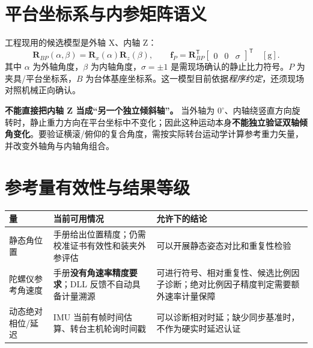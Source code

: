 \section{平台坐标系与内参矩阵语义}
工程现用的候选模型是外轴 X、内轴 Z：
\begin{equation}
\mathbf R_{BP}(\alpha,\beta)=\mathbf R_x(\alpha)\mathbf R_z(\beta),\qquad
\mathbf f_P=\mathbf R_{BP}^{\mathsf T}\begin{bmatrix}0&0&\sigma\end{bmatrix}^{\mathsf T}\quad[\mathrm g].
\label{eq:refacc}
\end{equation}
其中 $\alpha$ 为外轴角度，$\beta$ 为内轴角度，$\sigma=\pm1$ 是需现场确认的静止比力符号。$P$ 为夹具/平台坐标系，$B$ 为台体基座坐标系。这一模型目前依据\emph{程序约定}，还须现场对照机械正向确认。

\begin{keynote}
\textbf{不能直接把内轴 Z 当成“另一个独立倾斜轴”。} 当外轴为 $0^\circ$、内轴绕竖直方向旋转时，静止重力方向在平台坐标中不变化；因此这种运动本身\textbf{不能独立验证双轴倾角变化}。要验证横滚/俯仰的复合角度，需按实际转台运动学计算参考重力矢量，并改变外轴角与内轴角组合。
\end{keynote}
\section{参考量有效性与结果等级}
\noindent\begin{tabularx}{\textwidth}{p{38mm}p{36mm}Y}
\toprule
量 & 当前可用情况 & 允许下的结论\\\midrule
静态角位置 & 手册给出位置精度；仍需校准证书有效性和装夹外参评估 & 可以开展静态姿态对比和重复性检验\\
陀螺仪参考角速度 & 手册\textbf{没有角速率精度要求}；DLL 反馈不自动具备计量溯源 & 可进行符号、相对重复性、候选比例因子诊断；绝对比例因子精度判定需要额外速率计量保障\\
动态绝对相位/延迟 & IMU 当前有帧时间估算、转台主机轮询时间戳 & 可以诊断相对时延；缺少同步基准时，不作为硬实时延迟认证\\\bottomrule
\end{tabularx}
